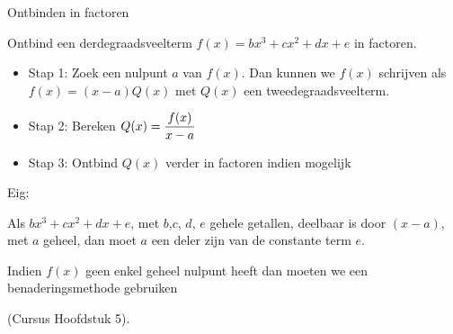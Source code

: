 \documentclass{beamer}
\begin{document}
\begin{frame} {Ontbinden in factoren}
\begin{problem}
Ontbind een derdegraadsveelterm $f(x) = b x^3+ c x^2+ d x+ e$ in
factoren.%
\end{problem}
\begin{itemize} 
    \item Stap 1: Zoek een nulpunt $a$ van $f(x)$. Dan kunnen we $f(x)$ schrijven als
$f(x) = (x-a) Q(x)$ met $Q(x)$ een tweedegraadsveelterm.
    \item Stap 2: Bereken $\displaystyle Q(x) = \frac{f(x)}{x-a}$
    \item Stap 3: Ontbind $Q(x)$ verder in factoren indien mogelijk
\end{itemize}
Eig:  

Als $b x^3+ c x^2+ d x+ e$, met $b$,$c$, $d$, $e$ gehele
getallen, deelbaar is door $(x-a)$, met $a$ geheel, dan moet $a$ een
deler zijn van de constante term $e$. 

Indien $f(x)$ geen enkel geheel nulpunt heeft dan moeten we een benaderingsmethode gebruiken 

(Cursus Hoofdstuk 5).
\end{frame}
\end{document}
